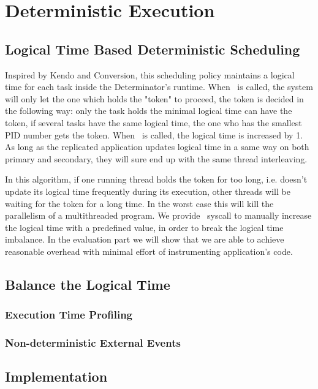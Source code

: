 \chapter{Deterministic Execution}
\section{Logical Time Based Deterministic Scheduling}
Inspired by Kendo\cite{olszewski2009kendo} and Conversion\cite{merrifieldincreasing}, this scheduling policy maintains a logical time for each task inside the Determinator's runtime. When \detstart\ is called, the system will only let the one which holds the "token" to proceed, the token is decided in the following way: only the task holds the minimal logical time can have the token, if several tasks have the same logical time, the one who has the smallest PID number gets the token. When \detend\ is called, the logical time is increased by 1. As long as the replicated application updates logical time in a same way on both primary and secondary, they will sure end up with the same thread interleaving.

In this algorithm, if one running thread holds the token for too long, i.e. doesn't update its logical time frequently during its execution, other threads will be waiting for the token for a long time. In the worst case this will kill the parallelism of a multithreaded program. We provide \dettick\ syscall to manually increase the logical time with a predefined value, in order to break the logical time imbalance. In the evaluation part we will show that we are able to achieve reasonable overhead with minimal effort of instrumenting application's code.
\section{Balance the Logical Time}
\subsection{Execution Time Profiling}
\subsection{Non-deterministic External Events}
\section{Implementation}